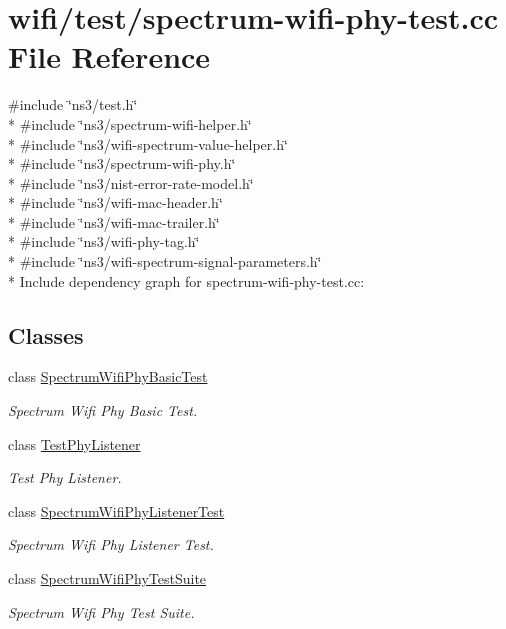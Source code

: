 \hypertarget{spectrum-wifi-phy-test_8cc}{}\section{wifi/test/spectrum-\/wifi-\/phy-\/test.cc File Reference}
\label{spectrum-wifi-phy-test_8cc}
{\ttfamily \#include \char`\"{}ns3/test.\+h\char`\"{}}\\*
{\ttfamily \#include \char`\"{}ns3/spectrum-\/wifi-\/helper.\+h\char`\"{}}\\*
{\ttfamily \#include \char`\"{}ns3/wifi-\/spectrum-\/value-\/helper.\+h\char`\"{}}\\*
{\ttfamily \#include \char`\"{}ns3/spectrum-\/wifi-\/phy.\+h\char`\"{}}\\*
{\ttfamily \#include \char`\"{}ns3/nist-\/error-\/rate-\/model.\+h\char`\"{}}\\*
{\ttfamily \#include \char`\"{}ns3/wifi-\/mac-\/header.\+h\char`\"{}}\\*
{\ttfamily \#include \char`\"{}ns3/wifi-\/mac-\/trailer.\+h\char`\"{}}\\*
{\ttfamily \#include \char`\"{}ns3/wifi-\/phy-\/tag.\+h\char`\"{}}\\*
{\ttfamily \#include \char`\"{}ns3/wifi-\/spectrum-\/signal-\/parameters.\+h\char`\"{}}\\*
Include dependency graph for spectrum-\/wifi-\/phy-\/test.cc\+:
\subsection*{Classes}
\begin{DoxyCompactItemize}
\item 
class \hyperlink{classSpectrumWifiPhyBasicTest}{Spectrum\+Wifi\+Phy\+Basic\+Test}
\begin{DoxyCompactList}\small\item\em Spectrum Wifi Phy Basic Test. \end{DoxyCompactList}\item 
class \hyperlink{classTestPhyListener}{Test\+Phy\+Listener}
\begin{DoxyCompactList}\small\item\em Test Phy Listener. \end{DoxyCompactList}\item 
class \hyperlink{classSpectrumWifiPhyListenerTest}{Spectrum\+Wifi\+Phy\+Listener\+Test}
\begin{DoxyCompactList}\small\item\em Spectrum Wifi Phy Listener Test. \end{DoxyCompactList}\item 
class \hyperlink{classSpectrumWifiPhyTestSuite}{Spectrum\+Wifi\+Phy\+Test\+Suite}
\begin{DoxyCompactList}\small\item\em Spectrum Wifi Phy Test Suite. \end{DoxyCompactList}\end{DoxyCompactItemize}
